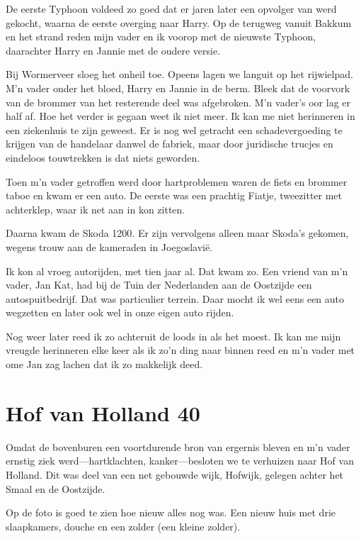 \documentclass[12pt,twoside]{memoir}
\begin{document}
De eerste Typhoon voldeed zo goed dat er jaren later een opvolger van werd gekocht, waarna de eerste overging naar Harry. Op de terugweg vanuit Bakkum en het strand reden mijn vader en ik voorop met de nieuwste Typhoon, daarachter Harry en Jannie met de oudere versie. 

Bij Wormerveer sloeg het onheil toe. Opeens lagen we languit op het rijwielpad. M'n vader onder het bloed, Harry en Jannie in de berm. Bleek dat de voorvork van de brommer van het resterende deel was afgebroken. M'n vader's oor lag er half af. Hoe het verder is gegaan weet ik niet meer. Ik kan me niet herinneren in een ziekenhuis te zijn geweest. Er is nog wel getracht een schadevergoeding te krijgen van de handelaar danwel de fabriek, maar door juridische trucjes en eindeloos touwtrekken is dat niets geworden. 

Toen m'n vader getroffen werd door hartproblemen waren de fiets en brommer taboe en kwam er een auto. De eerste was een prachtig Fiatje, tweezitter met achterklep, waar ik net aan in kon zitten. 

Daarna kwam de Skoda 1200. Er zijn vervolgens alleen maar Skoda's gekomen, wegens trouw aan de kameraden in Joegoslavië. 

Ik kon al vroeg autorijden, met tien jaar al. Dat kwam zo. Een vriend van m'n vader, Jan Kat, had bij de Tuin der Nederlanden aan de Oostzijde een autospuitbedrijf. Dat was particulier terrein. Daar mocht ik wel eens een auto wegzetten en later ook wel in onze eigen auto rijden. 

Nog weer later reed ik zo achteruit de loods in als het moest. Ik kan me mijn vreugde herinneren elke keer als ik zo'n ding naar binnen reed en m'n vader met ome Jan zag lachen dat ik zo makkelijk deed.

\chapter{Hof van Holland 40} %
\label{cha:hofvanholland}

Omdat de bovenburen een voortdurende bron van ergernis bleven en m’n vader ernstig ziek werd---hartklachten, kanker---besloten we te verhuizen naar Hof van Holland. Dit was deel van een net gebouwde wijk, Hofwijk, gelegen achter het Smaal en de Oostzijde. 

Op de foto is goed te zien hoe nieuw alles nog was. Een nieuw huis met drie slaapkamers, douche en een zolder (een kleine zolder). 
\end{document}
